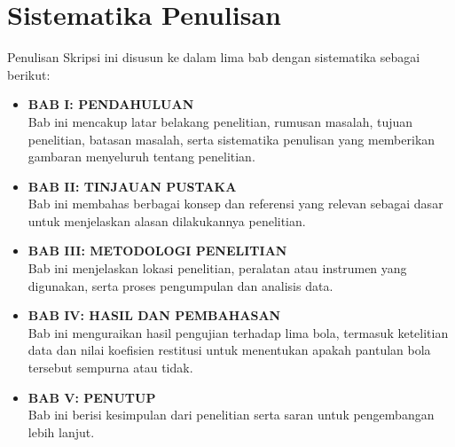 \section{Sistematika Penulisan}
 Penulisan Skripsi ini disusun ke dalam lima bab dengan sistematika sebagai berikut:
\begin{itemize}
	\item \textbf{BAB I: PENDAHULUAN} \\
	Bab ini mencakup latar belakang penelitian, rumusan masalah, tujuan penelitian, batasan masalah, serta sistematika penulisan yang memberikan gambaran menyeluruh tentang penelitian.
	\item \textbf{BAB II: TINJAUAN PUSTAKA} \\
	Bab ini membahas berbagai konsep dan referensi yang relevan sebagai dasar untuk menjelaskan alasan dilakukannya penelitian.
	\item \textbf{BAB III: METODOLOGI PENELITIAN} \\
	Bab ini menjelaskan lokasi penelitian, peralatan atau instrumen yang digunakan, serta proses pengumpulan dan analisis data.
	\item \textbf{BAB IV: HASIL DAN PEMBAHASAN} \\
	Bab ini menguraikan hasil pengujian terhadap lima bola, termasuk ketelitian data dan nilai koefisien restitusi untuk menentukan apakah pantulan bola tersebut sempurna atau tidak.
	\item \textbf{BAB V: PENUTUP} \\
	Bab ini berisi kesimpulan dari penelitian serta saran untuk pengembangan lebih lanjut.
\end{itemize}
